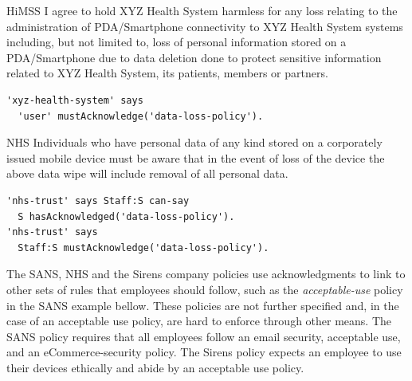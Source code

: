 \documentclass[thesis.tex]{subfiles}
\begin{document}
\begin{center}
  \noindent
    \begin{policyrule}{HiMSS}
      I agree to hold XYZ Health System harmless for any loss relating to the
      administration of PDA/Smartphone connectivity to XYZ Health System systems
      including, but not limited to, loss of personal information stored on a
      PDA/Smartphone due to data deletion done to protect sensitive information
      related to XYZ Health System, its patients, members or partners.
      \normalfont
      \begin{lstlisting}
'xyz-health-system' says
  'user' mustAcknowledge('data-loss-policy').
      \end{lstlisting}
    \end{policyrule}
    \begin{policyrule}{NHS}
      Individuals who have personal data of any kind stored on a corporately
      issued mobile device must be aware that in the event of loss of the device
      the above data wipe will include removal of all personal data.
      \normalfont
      \begin{lstlisting}
'nhs-trust' says Staff:S can-say
  S hasAcknowledged('data-loss-policy').
'nhs-trust' says
  Staff:S mustAcknowledge('data-loss-policy').
      \end{lstlisting}
    \end{policyrule}
\end{center}

The SANS, NHS and the Sirens company policies use acknowledgments to link to
other sets of rules that employees should follow, such as the
\emph{acceptable-use} policy in the SANS example bellow. These policies are not
further specified and, in the case of an acceptable use policy, are hard to
enforce through other means. The SANS policy requires that all employees follow
an email security, acceptable use, and an eCommerce-security policy. The Sirens
policy expects an employee to use their devices ethically and abide by an
acceptable use policy.
\end{document}

